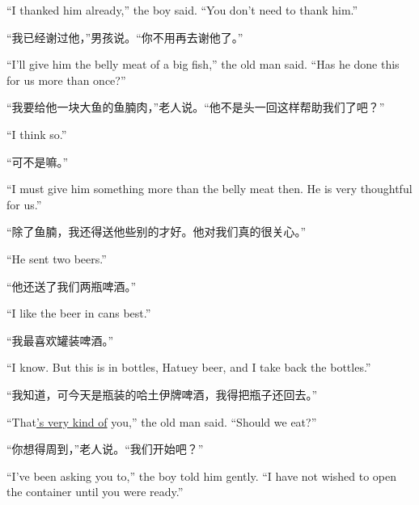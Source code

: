 \begin{paracol}{2}
``I thanked him already,'' the boy said. ``You don't need to thank him.''

\switchcolumn

“我已经谢过他，”男孩说。“你不用再去谢他了。”

\switchcolumn*

``I'll give him the \gls{belly} meat of a big fish,'' the old man said. ``Has he done this for us more than once?''

\switchcolumn

“我要给他一块大鱼的鱼腩肉，”老人说。“他不是头一回这样帮助我们了吧？”

\switchcolumn*

``I think so.''

\switchcolumn

“可不是嘛。”

\switchcolumn*

``I must give him something more than the belly meat then. He is very \gls{thoughtful} for us.''

\switchcolumn

“除了鱼腩，我还得送他些别的才好。他对我们真的很关心。”

\switchcolumn*

``He sent two beers.''

\switchcolumn

“他还送了我们两瓶啤酒。”

\switchcolumn*

``I like the beer in \glspl{can} best.''

\switchcolumn

“我最喜欢罐装啤酒。”

\switchcolumn*

``I know. But this is in bottles, Hatuey beer, and I take back the bottles.''

\switchcolumn

“我知道，可今天是瓶装的哈土伊牌啤酒，我得把瓶子还回去。”

\switchcolumn*

``That\uline{'s very kind of} you,'' the old man said. ``Should we eat?''

\switchcolumn

“你想得周到，”老人说。“我们开始吧？”

\switchcolumn*

``I've been asking you to,'' the boy told him gently. ``I have not wished to open the container until you were ready.''

\switchcolumn


\end{paracol}
